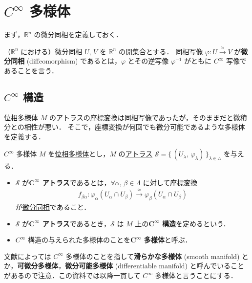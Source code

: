 \documentclass[geometry_main]{subfiles}
\begin{document}
\section{$C^\infty$ 多様体}

まず，$\mathbb{R}^n$ の微分同相を定義しておく．
\begin{mydef}[label=def.diffeomo]{（$\mathbb{R}^n$ における）微分同相}
	$U,\, V$ を\underline{ $\mathbb{R}^n$ の開集合}とする．
	同相写像 $\varphi \colon U \xrightarrow{\approx} V$ が\textbf{微分同相} (diffeomorphism) であるとは，$\varphi$ とその逆写像 $\varphi^{-1}$ がともに $C^\infty$ 写像であることを言う．
\end{mydef}

\subsection{$C^\infty$ 構造}

\hyperref[def.topomani]{位相多様体} $M$ のアトラスの座標変換は同相写像であったが，そのままだと微積分との相性が悪い．
そこで，座標変換が何回でも微分可能であるような多様体を定義する．
\begin{mydef}[label=diffmani]{$C^\infty$ 多様体}
	$M$ を\hyperref[def.topomani]{位相多様体}とし，$M$ の\hyperref[def.atlas]{アトラス} $\mathcal{S} = \bigl\{\, (U_\lambda,\, \varphi_\lambda) \,\bigr\}_{\lambda \in \Lambda}$ を与える．
	\begin{itemize}
		\item $\mathcal{S}$ が\textbf{$\bm{C^\infty}$ アトラス}であるとは，$\forall \alpha,\, \beta \in \Lambda$ に対して座標変換
		\begin{align}
			f_{\beta\alpha} \colon \varphi_\alpha(U_\alpha\cap U_\beta) \xrightarrow{\approx} \varphi_\beta (U_\alpha\cap U_\beta)
		\end{align}
		が\hyperref[def.diffeomo]{微分同相}であること．
		\item $\mathcal{S}$ が\textbf{$\bm{C^\infty}$ アトラス}であるとき，$\mathcal{S}$ は $M$ 上の\textbf{$\bm{C^\infty}$ 構造}を定めるという．
		\item $C^\infty$ 構造の与えられた多様体のことを\textbf{$\bm{C^\infty}$ 多様体}と呼ぶ．
	\end{itemize}
\end{mydef}

\begin{marker}
	文献によっては $C^\infty$ 多様体のことを指して\textbf{滑らかな多様体} (smooth manifold) とか，\textbf{可微分多様体}，\textbf{微分可能多様体} (differentiable manifold) と呼んでいることがあるので注意．この資料では以降一貫して $C^\infty$ 多様体と言うことにする．
\end{marker}
\end{document}
